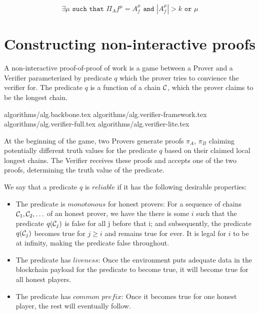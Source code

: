 \documentclass[11pt]{llncs}
\begin{document}
\begin{equation*}
    \exists \mu \texttt{ such that } \Pi_{A}{f}^{\mu} = A_f^{\mu}
    \texttt{ and }
    |A_f^{\mu}| > k
    \texttt{ or } \mu
\end{equation*}

\section{Constructing non-interactive proofs}

A non-interactive proof-of-proof of work is a game between a Prover and a
Verifier parameterized by predicate $q$ which the prover tries to convience the
verifier for. The predicate $q$ is a function of a chain $\mathcal{C}$, which the
prover claims to be the longest chain.

{algorithms/alg.backbone.tex}
{algorithms/alg.verifier-framework.tex}
{algorithms/alg.verifier-full.tex}
{algorithms/alg.verifier-lite.tex}

At the beginning of the game, two Provers generate proofs $\pi_A$, $\pi_B$
claiming potentially different truth values for the predicate $q$ based on
their claimed local longest chains. The Verifier receives these proofs and
accepts one of the two proofs, determining the truth value of the predicate.

We say that a predicate $q$ is $\textit{reliable}$ if it has the following
desirable properties:

\begin{itemize}
    \item The predicate is $\textit{monotonous}$ for honest provers: For a
        sequence of chains $\mathcal{C} _1, \mathcal{C} _2, \ldots$ of an honest prover, we
        have the there is some $i$ such that the predicate $q(\mathcal{C} _j)$ is
        false for all j before that i; and subsequently, the predicate
        $q(\mathcal{C} _j)$ becomes true for $j \geq i$ and remains true for ever.
        It is legal for $i$ to be at infinity, making the predicate false
        throughout.
    \item The predicate has $\textit{liveness}$: Once the environment puts
        adequate data in the blockchain payload for the predicate to become
        true, it will become true for all honest players.
    \item The predicate has $\textit{common prefix}$: Once it becomes true for
        one honest player, the rest will eventually follow.
\end{itemize}
\end{document}
